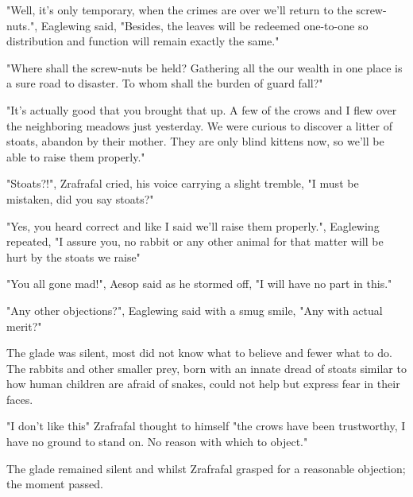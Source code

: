 \documentclass[smalldemyvopaper,11pt,twoside,onecolumn,openright,extrafontsizes]{memoir}
\begin{document}
"Well, it's only temporary, when the crimes are over we'll return to the screw-nuts.", Eaglewing said, "Besides, the leaves will be redeemed one-to-one so distribution and function will remain exactly the same."

"Where shall the screw-nuts be held? Gathering all the our wealth in one place is a sure road to disaster. To whom shall the burden of guard fall?"

"It's actually good that you brought that up. A few of the crows and I flew over the neighboring meadows just yesterday. We were curious to discover a litter of stoats, abandon by their mother. They are only blind kittens now, so we'll be able to raise them properly."


"Stoats?!", Zrafrafal cried, his voice carrying a slight tremble, "I must be mistaken, did you say stoats?"

"Yes, you heard correct and like I said we'll raise them properly.", Eaglewing repeated, "I assure you, no rabbit or any other animal for that matter will be hurt by the stoats we raise"

"You all gone mad!", Aesop said as he stormed off, "I will have no part in this."

"Any other objections?", Eaglewing said with a smug smile, "Any with actual merit?" 

The glade was silent, most did not know what to believe and fewer what to do. The rabbits and other smaller prey, born with an innate dread of stoats similar to how human children are afraid of snakes, could not help but express fear in their faces. 

"I don't like this" Zrafrafal thought to himself "the crows have been trustworthy, I have no ground to stand on. No reason with which to object." 

The glade remained silent and whilst Zrafrafal grasped for a reasonable objection; the moment passed.
\end{document}
